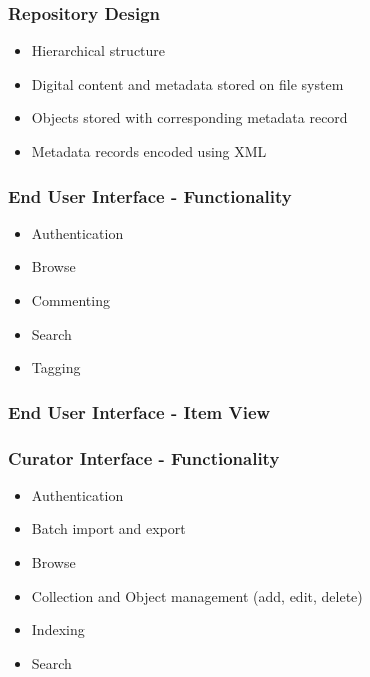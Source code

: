 \documentclass[xcolor=dvitex,t,11pt]{beamer}
\begin{document}
\begin{frame}[fragile]
\frametitle{Repository Design}
\begin{figure}
\centering
\framebox[\textwidth]{%

}
\end{figure}
\begin{itemize}
\item Hierarchical structure
\item Digital content and metadata stored on file system
\item Objects stored with corresponding metadata record
\item Metadata records encoded using XML
\end{itemize}
\begin{figure}
\end{figure}
\end{frame}

\begin{frame}[fragile]
\frametitle{End User Interface - Functionality}
\begin{figure}
\centering
\framebox[\textwidth]{%

}
\end{figure}
\begin{itemize}
\item Authentication
\item Browse
\item Commenting
\item Search
\item Tagging
\end{itemize}
\end{frame}

\begin{frame}[fragile]
\frametitle{End User Interface - Item View}
\begin{figure}
\centering
{}
\end{figure}
\end{frame}

\begin{frame}[fragile]
\frametitle{Curator Interface - Functionality}
\begin{figure}
\centering
\framebox[\textwidth]{%

}
\end{figure}
\begin{itemize}
\item Authentication
\item Batch import and export
\item Browse
\item Collection and Object management (add, edit, delete)
\item Indexing
\item Search
\end{itemize}
\end{frame}
\end{document}

